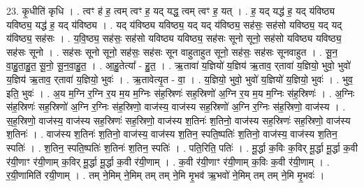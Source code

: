 \documentclass[17pt]{extarticle}
\begin{document}
23. कृ॒धीति॑ कृधि । . त्वꣳ ह॑ ह॒ त्वम् त्वꣳ ह॒ यद् यद्ध॒ त्वम् त्वꣳ ह॒ यत् । . ह॒ यद् यद्ध॑ ह॒ यद् य॑विष्ठ्य यविष्ठ्य॒ यद्ध॑ ह॒ यद् य॑विष्ठ्य । . यद् य॑विष्ठ्य यविष्ठ्य॒ यद् यद् य॑विष्ठ्य॒ सह॑सः॒ सह॑सो यविष्ठ्य॒ यद् यद् य॑विष्ठ्य॒ सह॑सः । . य॒वि॒ष्ठ्य॒ सह॑सः॒ सह॑सो यविष्ठ्य यविष्ठ्य॒ सह॑सः सूनो सूनो॒ सह॑सो यविष्ठ्य यविष्ठ्य॒ सह॑सः सूनो । . सह॑सः सूनो सूनो॒ सह॑सः॒ सह॑सः सून वाहुताहुत सूनो॒ सह॑सः॒ सह॑सः सूनवाहुत । . सू॒न॒ वा॒हु॒ता॒हु॒त॒ सू॒नो॒ सू॒न॒वा॒हु॒त॒ । . आ॒हु॒तेत्या᳚ - हु॒त॒ । . ऋ॒तावा॑ य॒ज्ञियो॑ य॒ज्ञिय॑ ऋ॒ताव॒ र्‌तावा॑ य॒ज्ञियो॒ भुवो॒ भुवो॑ य॒ज्ञिय॑ ऋ॒ताव॒ र्‌तावा॑ य॒ज्ञियो॒ भुवः॑ । . ऋ॒तावेत्यृ॒त - वा॒ । . य॒ज्ञियो॒ भुवो॒ भुवो॑ य॒ज्ञियो॑ य॒ज्ञियो॒ भुवः॑ । . भुव॒ इति॒ भुवः॑ । . अ॒य म॒ग्नि र॒ग्नि र॒य म॒य म॒ग्निः स॑ह॒स्रिणः॑ सह॒स्रिणो॑ अ॒ग्नि र॒य म॒य म॒ग्निः स॑ह॒स्रिणः॑ । . अ॒ग्निः स॑ह॒स्रिणः॑ सह॒स्रिणो॑ अ॒ग्नि र॒ग्निः स॑ह॒स्रिणो॒ वाज॑स्य॒ वाज॑स्य सह॒स्रिणो॑ अ॒ग्नि र॒ग्निः स॑ह॒स्रिणो॒ वाज॑स्य । . स॒ह॒स्रिणो॒ वाज॑स्य॒ वाज॑स्य सह॒स्रिणः॑ सह॒स्रिणो॒ वाज॑स्य श॒तिनः॑ श॒तिनो॒ वाज॑स्य सह॒स्रिणः॑ सह॒स्रिणो॒ वाज॑स्य श॒तिनः॑ । . वाज॑स्य श॒तिनः॑ श॒तिनो॒ वाज॑स्य॒ वाज॑स्य श॒तिन॒ स्पति॒ष्पतिः॑ श॒तिनो॒ वाज॑स्य॒ वाज॑स्य श॒तिन॒ स्पतिः॑ । . श॒तिन॒ स्पति॒ष्पतिः॑ श॒तिनः॑ श॒तिन॒ स्पतिः॑ । . पति॒रिति॒ पतिः॑ । . मू॒र्द्धा क॒विः क॒विर् मू॒र्द्धा मू॒र्द्धा क॒वी र॑यी॒णाꣳ र॑यी॒णाम् क॒विर् मू॒र्द्धा मू॒र्द्धा क॒वी र॑यी॒णाम् । . क॒वी र॑यी॒णाꣳ र॑यी॒णाम् क॒विः क॒वी र॑यी॒णाम् । . र॒यी॒णामिति॑ रयी॒णाम् । . तम् ने॒मिम् ने॒मिम् तम् तम् ने॒मि मृ॒भव॑ ऋ॒भवो॑ ने॒मिम् तम् तम् ने॒मि मृ॒भवः॑ । \newline
\end{document}
